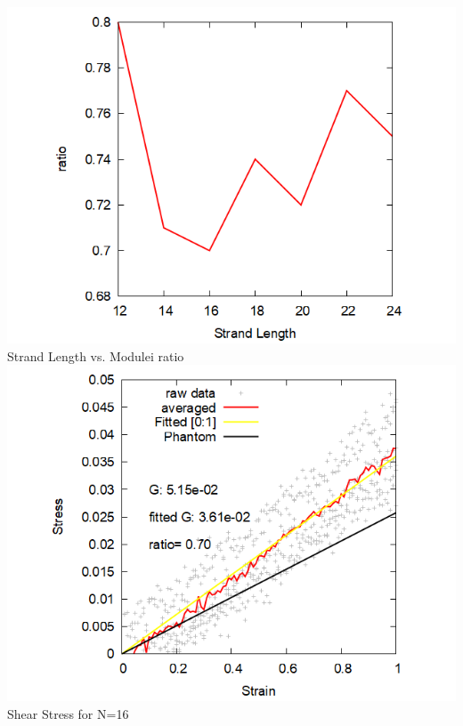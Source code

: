 \documentclass[12pt, dvipdfmx]{beamer}
\begin{document}
\begin{frame}
\begin{itemize}
	\end{itemize}
		\begin{columns}[totalwidth=\linewidth]
			\centering
					\includegraphics[width=\textwidth]{n_mod.png}\\
					\scriptsize{Strand Length vs. Modulei ratio}
				\centering
					\includegraphics[width=\textwidth]{shear_n16.png}\\
					\scriptsize{Shear Stress for N=16}
		\end{columns}
		
\end{frame}
\end{document}

